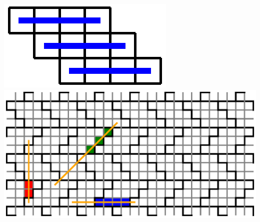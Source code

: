 \documentclass{article}
\begin{document}
\includegraphics{8-rules3.eps}
\\
\includegraphics{8-sol.eps}
\end{document}
